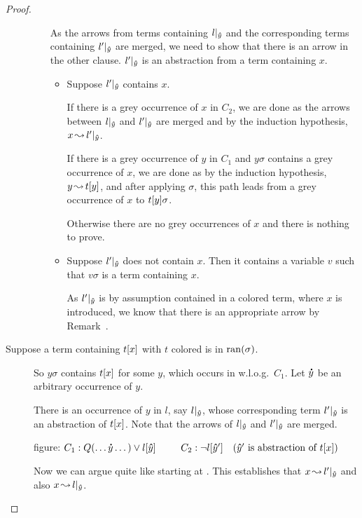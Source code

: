 \documentclass[,%
	paper=a4,%
	DIV11, %
	twoside=false,%
	liststotoc,
	bibtotoc,
	draft=false,%
	numbers=noendperiod
]{scrartcl}
\begin{document}
\begin{proof}
\begin{description}
\begin{itemize}
					As the arrows from terms containing $l|_{\bm\hat y}$ and the corresponding terms containing $l'|_{\bm\hat y}$ are merged, we need to show that there is an arrow in the other clause. $l'|_{\bm\hat y}$ is an abstraction from a term containing $x$.

					\markC
					\begin{itemize}
						\item 
							Suppose $l'|_{\bm\hat y}$ contains $x$. 

							If there is a grey occurrence of $x$ in $C_2$, we are done as the arrows between $l|_{\bm\hat y}$ and $l'|_{\bm\hat y}$ are merged and by the induction hypothesis, $x \operatorname{\leadsto} l'|_{\bm\hat y}$.

							If there is a grey occurrence of $y$ in $C_1$ and $y\sigma$ contains a grey occurrence of $x$, we are done as by the induction hypothesis, $y \operatorname{\leadsto} t[y]$,
							and after applying $\sigma$, this path leads from a grey occurrence of $x$ to $t[y]\sigma$.

							Otherwise there are no grey occurrences of $x$ and there is nothing to prove.

						\item 
							Suppose $l'|_{\bm\hat y}$ does not contain $x$.
							Then it contains a variable $v$ such that $v\sigma$ is a term containing $x$.


							As $l'|_{\bm\hat y}$ is by assumption contained in a colored term, where $x$ is introduced, we know that there is an appropriate arrow by Remark~\substremarkref.


					\end{itemize}
			\end{itemize}

		\item [Suppose a term containing $t[x]$ with $t$ colored is in $\operatorname{ran}(\sigma)$.]
			So $y\sigma$ contains $t[x]$ for some $y$, which occurs in w.l.o.g.\ $C_1$.
			Let $\bm\dot y$ be an arbitrary occurrence of $y$.

			There is an occurrence of $y$ in $l$, say $l|_{\bm\hat y}$, whose corresponding term $l'|_{\bm\hat y}$ is an abstraction of $t[x]$. Note that the arrows of $l|_{\bm\hat y}$ and $l'|_{\bm\hat y}$ are merged.

			figure:
			$C_1: Q(\dots \bdot y \dots) \lor l\occ{\bhat y}\quad\quad$
			$C_2: \lnot l[\bm\hat y']\quad(\bm\hat y' \text{ is abstraction of } t[x])$

			Now we can argue quite like starting at \markC.
			This establishes that $x \operatorname{\leadsto} l'|_{\bm\hat y}$ and also $x \operatorname{\leadsto} l|_{\bm\hat y}$.


\end{description}
\end{proof}
\end{document}
